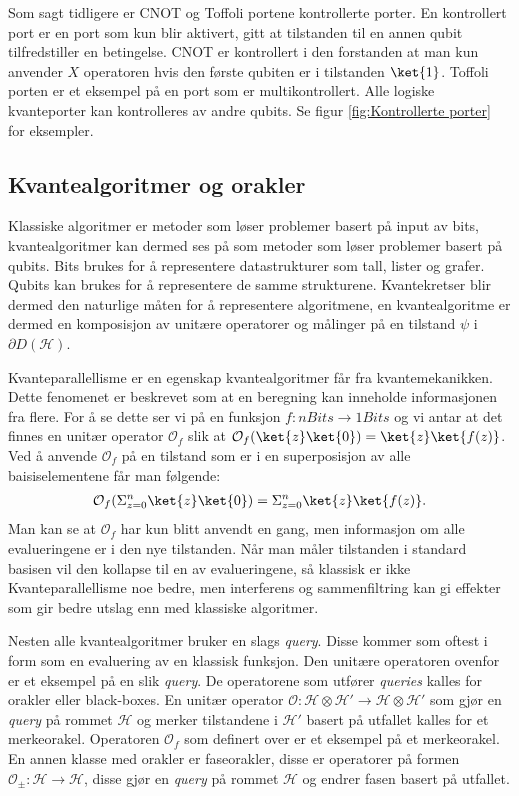         Som sagt tidligere er CNOT og Toffoli portene kontrollerte porter. En kontrollert port er en port som kun blir aktivert, gitt at tilstanden til en annen qubit tilfredstiller en betingelse. CNOT er kontrollert i den forstanden at man kun anvender $X$ operatoren hvis den første qubiten er i tilstanden $\ket{1}$. Toffoli porten er et eksempel på en port som er multikontrollert. Alle logiske kvanteporter kan kontrolleres av andre qubits. Se figur \ref{fig:Kontrollerte porter} for eksempler.

\subsection{Kvantealgoritmer og orakler}

        Klassiske algoritmer er metoder som løser problemer basert på input av bits, kvantealgoritmer kan dermed ses på som metoder som løser problemer basert på qubits. Bits brukes for å representere datastrukturer som tall, lister og grafer. Qubits kan brukes for å representere de samme strukturene. Kvantekretser blir dermed den naturlige måten for å representere algoritmene, en kvantealgoritme er dermed en komposisjon av unitære operatorer og målinger på en tilstand $\psi$ i $\partial D(\mathcal{H})$. 
        
        Kvanteparallellisme er en egenskap kvantealgoritmer får fra kvantemekanikken. Dette fenomenet er beskrevet som at en beregning kan inneholde informasjonen fra flere. For å se dette ser vi på en funksjon $f:nBits\rightarrow 1Bits$ og vi antar at det finnes en unitær operator $\mathcal{O}_f$ slik at $\mathcal{O}_f(\ket{z}\ket{0})=\ket{z}\ket{f(z)}$. Ved å anvende $\mathcal{O}_f$ på en tilstand som er i en superposisjon av alle baisiselementene får man følgende:
        \begin{align*}
            \mathcal{O}_f(\Sigma_{z=0}^n\ket{z}\ket{0}) = \Sigma_{z=0}^n\ket{z}\ket{f(z)}.
        \end{align*}
        Man kan se at $\mathcal{O}_f$ har kun blitt anvendt en gang, men informasjon om alle evalueringene er i den nye tilstanden. Når man måler tilstanden i standard basisen vil den kollapse til en av evalueringene, så klassisk er ikke Kvanteparallellisme noe bedre, men interferens og sammenfiltring kan gi effekter som gir bedre utslag enn med klassiske algoritmer.

        Nesten alle kvantealgoritmer bruker en slags \emph{query}. Disse kommer som oftest i form som en evaluering av en klassisk funksjon. Den unitære operatoren ovenfor er et eksempel på en slik \emph{query}. De operatorene som utfører \emph{queries} kalles for orakler eller black-boxes. En unitær operator $\mathcal{O}:\mathcal{H}\otimes\mathcal{H}'\rightarrow\mathcal{H}\otimes\mathcal{H}'$ som gjør en \emph{query} på rommet $\mathcal{H}$ og merker tilstandene i $\mathcal{H}'$ basert på utfallet kalles for et merkeorakel. Operatoren $\mathcal{O}_f$ som definert over er et eksempel på et merkeorakel. En annen klasse med orakler er faseorakler, disse er operatorer på formen $\mathcal{O}_\pm:\mathcal{H}\rightarrow\mathcal{H}$, disse gjør en \emph{query} på rommet $\mathcal{H}$ og endrer fasen basert på utfallet.

